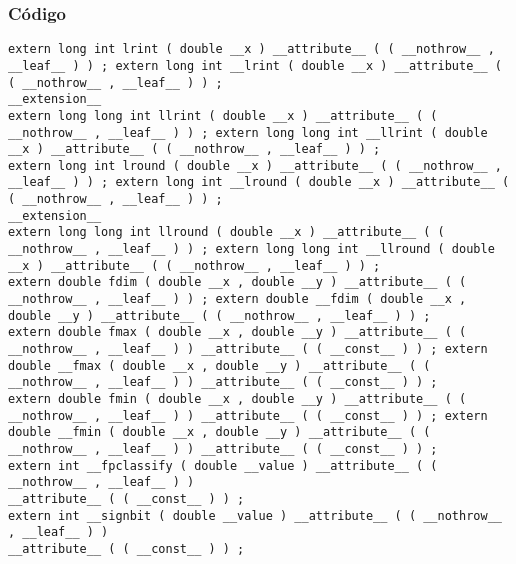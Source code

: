 \documentclass{beamer}
\begin{document}
\begin{frame}[fragile]
\frametitle{C\'odigo}
\begin{verbatim}
extern long int lrint ( double __x ) __attribute__ ( ( __nothrow__ , __leaf__ ) ) ; extern long int __lrint ( double __x ) __attribute__ ( ( __nothrow__ , __leaf__ ) ) ; 
__extension__ 
extern long long int llrint ( double __x ) __attribute__ ( ( __nothrow__ , __leaf__ ) ) ; extern long long int __llrint ( double __x ) __attribute__ ( ( __nothrow__ , __leaf__ ) ) ; 
extern long int lround ( double __x ) __attribute__ ( ( __nothrow__ , __leaf__ ) ) ; extern long int __lround ( double __x ) __attribute__ ( ( __nothrow__ , __leaf__ ) ) ; 
__extension__ 
extern long long int llround ( double __x ) __attribute__ ( ( __nothrow__ , __leaf__ ) ) ; extern long long int __llround ( double __x ) __attribute__ ( ( __nothrow__ , __leaf__ ) ) ; 
extern double fdim ( double __x , double __y ) __attribute__ ( ( __nothrow__ , __leaf__ ) ) ; extern double __fdim ( double __x , double __y ) __attribute__ ( ( __nothrow__ , __leaf__ ) ) ; 
extern double fmax ( double __x , double __y ) __attribute__ ( ( __nothrow__ , __leaf__ ) ) __attribute__ ( ( __const__ ) ) ; extern double __fmax ( double __x , double __y ) __attribute__ ( ( __nothrow__ , __leaf__ ) ) __attribute__ ( ( __const__ ) ) ; 
extern double fmin ( double __x , double __y ) __attribute__ ( ( __nothrow__ , __leaf__ ) ) __attribute__ ( ( __const__ ) ) ; extern double __fmin ( double __x , double __y ) __attribute__ ( ( __nothrow__ , __leaf__ ) ) __attribute__ ( ( __const__ ) ) ; 
extern int __fpclassify ( double __value ) __attribute__ ( ( __nothrow__ , __leaf__ ) ) 
__attribute__ ( ( __const__ ) ) ; 
extern int __signbit ( double __value ) __attribute__ ( ( __nothrow__ , __leaf__ ) ) 
__attribute__ ( ( __const__ ) ) ; 
\end{verbatim}
\end{frame}
\end{document}
